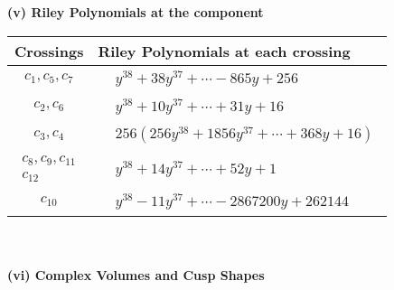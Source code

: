 \documentclass[1p]{elsarticle_modified}
\theoremstyle{definition}
\begin{document}
\newpage\renewcommand{\arraystretch}{1}
\flushleft \textbf{(v) Riley Polynomials at the component}\newline \\
\begin{tabular}{m{50pt}|m{274pt}}
Crossings & \hspace{64pt}Riley Polynomials at each crossing \\
\hline $$\begin{aligned}c_{1},c_{5},c_{7}\end{aligned}$$&$\begin{aligned}
&y^{38}+38 y^{37}+\cdots-865 y+256
\end{aligned}$\\
\hline $$\begin{aligned}c_{2},c_{6}\end{aligned}$$&$\begin{aligned}
&y^{38}+10 y^{37}+\cdots+31 y+16
\end{aligned}$\\
\hline $$\begin{aligned}c_{3},c_{4}\end{aligned}$$&$\begin{aligned}
&256(256 y^{38}+1856 y^{37}+\cdots+368 y+16)
\end{aligned}$\\
\hline $$\begin{aligned}c_{8},c_{9},c_{11}\\c_{12}\end{aligned}$$&$\begin{aligned}
&y^{38}+14 y^{37}+\cdots+52 y+1
\end{aligned}$\\
\hline $$\begin{aligned}c_{10}\end{aligned}$$&$\begin{aligned}
&y^{38}-11 y^{37}+\cdots-2867200 y+262144
\end{aligned}$\\
\hline
\end{tabular}\\~\\
\newpage\flushleft \textbf{(vi) Complex Volumes and Cusp Shapes}
\end{document}
